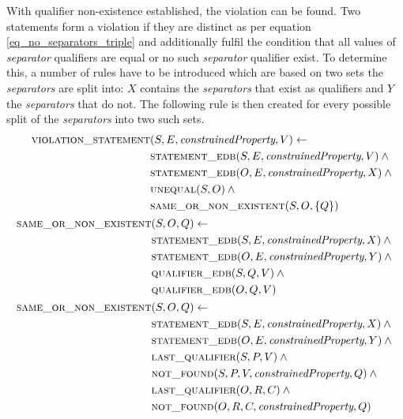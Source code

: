 \documentclass[hyperref,bachelorofscience,fleqn]{cgvpub}
\begin{document}
With qualifier non-existence established, the violation can be found. Two statements form a violation if they are distinct as per equation \ref{eq_no_separators_triple} and additionally fulfil the condition that all values of \emph{separator} qualifiers are equal or no such \emph{separator} qualifier exist. To determine this, a number of rules have to be introduced which are based on two sets the \emph{separators} are split into: \(X\) contains the \emph{separators} that exist as qualifiers and \(Y\) the \emph{separators} that do not. The following rule is then created for every possible split of the \emph{separators} into two such sets.
\begin{align}
\begin{split}
\textsc{violation\_statement}&(S, E, \emph{constrainedProperty}, V) \leftarrow \\
&\textsc{statement\_edb}(S, E, \emph{constrainedProperty}, V) \wedge{} \\
&\textsc{statement\_edb}(O, E, \emph{constrainedProperty}, X) \wedge{} \\
&\textsc{unequal}(S, O) \wedge{} \\
&\textsc{same\_or\_non\_existent}(S, O, \{Q\})
\end{split}\\
\begin{split}
\textsc{same\_or\_non\_existent}&(S, O, Q) \leftarrow \\
&\textsc{statement\_edb}(S, E, \emph{constrainedProperty}, X) \wedge{} \\
&\textsc{statement\_edb}(O, E, \emph{constrainedProperty}, Y) \wedge{} \\
&\textsc{qualifier\_edb}(S, Q, V) \wedge{} \\
&\textsc{qualifier\_edb}(O, Q, V)
\end{split}\\
\begin{split}
\textsc{same\_or\_non\_existent}&(S, O, Q) \leftarrow{} \\
&\textsc{statement\_edb}(S, E, \emph{constrainedProperty}, X) \wedge{} \\
&\textsc{statement\_edb}(O, E, \emph{constrainedProperty}, Y) \wedge{} \\
&\textsc{last\_qualifier}(S, P, V) \wedge{} \\
&\textsc{not\_found}(S, P, V, \emph{constrainedProperty}, Q) \wedge{} \\
&\textsc{last\_qualifier}(O, R, C) \wedge{} \\
&\textsc{not\_found}(O, R, C, \emph{constrainedProperty}, Q)
\end{split}
\end{align}
\end{document}
